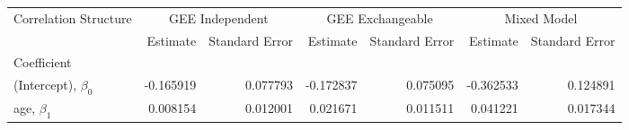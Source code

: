 \begin{tabular}{lrrrrrr}
\toprule
Correlation Structure & \multicolumn{2}{c}{GEE Independent} & \multicolumn{2}{c}{GEE Exchangeable} & \multicolumn{2}{c}{Mixed Model} \\
{} &        Estimate & Standard Error &         Estimate & Standard Error &    Estimate & Standard Error \\
Coefficient            &                 &                &                  &                &             &                \\
\midrule
(Intercept), $\beta_0$ &       -0.165919 &       0.077793 &        -0.172837 &       0.075095 &   -0.362533 &       0.124891 \\
age, $\beta_1$         &        0.008154 &       0.012001 &         0.021671 &       0.011511 &    0.041221 &       0.017344 \\
\bottomrule
\end{tabular}
